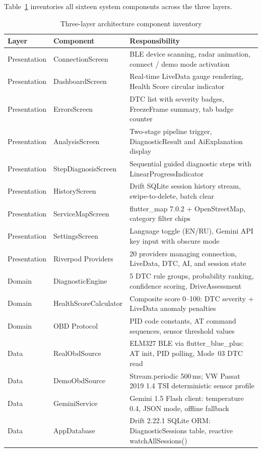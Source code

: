 Table~\ref{tab:components} inventories all sixteen system components across the three layers.

\begin{table}[!htbp]
\centering
\caption{Three-layer architecture component inventory}
\label{tab:components}
\begin{tabularx}{0.98\linewidth}{p{2.4cm} p{3.6cm} X}
\toprule
\rowcolor{tblhdr}
\color{white}\textbf{Layer} &
\color{white}\textbf{Component} &
\color{white}\textbf{Responsibility} \\
\midrule
Presentation & ConnectionScreen    & BLE device scanning, radar animation, connect / demo mode activation \\
Presentation & DashboardScreen     & Real-time LiveData gauge rendering, Health Score circular indicator \\
Presentation & ErrorsScreen        & DTC list with severity badges, FreezeFrame summary, tab badge counter \\
Presentation & AnalysisScreen      & Two-stage pipeline trigger, DiagnosticResult and AiExplanation display \\
Presentation & StepDiagnosisScreen & Sequential guided diagnostic steps with LinearProgressIndicator \\
Presentation & HistoryScreen       & Drift SQLite session history stream, swipe-to-delete, batch clear \\
Presentation & ServiceMapScreen    & flutter\_map 7.0.2 + OpenStreetMap, category filter chips \\
Presentation & SettingsScreen      & Language toggle (EN/RU), Gemini API key input with obscure mode \\
Presentation & Riverpod Providers  & 20 providers managing connection, LiveData, DTC, AI, and session state \\
Domain       & DiagnosticEngine    & 5 DTC rule groups, probability ranking, confidence scoring, DriveAssessment \\
Domain       & HealthScoreCalculator & Composite score 0--100: DTC severity + LiveData anomaly penalties \\
Domain       & OBD Protocol        & PID code constants, AT command sequences, sensor threshold values \\
Data         & RealObdSource       & ELM327 BLE via flutter\_blue\_plus: AT init, PID polling, Mode~03 DTC read \\
Data         & DemoObdSource       & Stream.periodic 500\,ms; VW Passat 2019 1.4 TSI deterministic sensor profile \\
Data         & GeminiService       & Gemini 1.5 Flash client: temperature 0.4, JSON mode, offline fallback \\
Data         & AppDatabase         & Drift 2.22.1 SQLite ORM: DiagnosticSessions table, reactive watchAllSessions() \\
\bottomrule
\end{tabularx}
\end{table}

